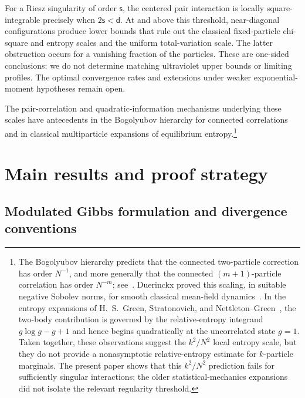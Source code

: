 \documentclass[11pt,reqno]{amsart}
\numberwithin{equation}{section}
\theoremstyle{plain}
\theoremstyle{remark}
\renewcommand{\d}{\mathsf{d}}
\newcommand{\s}{\mathsf{s}}
\begin{document}
For a Riesz singularity of order $\s$, the centered pair interaction is locally square-integrable precisely when $2\s<\d$.  At and above this threshold, near-diagonal configurations produce lower bounds that rule out the classical fixed-particle chi-square and entropy scales and the uniform total-variation scale.  The latter obstruction occurs for a vanishing fraction of the particles.  These are one-sided conclusions: we do not determine matching ultraviolet upper bounds or limiting profiles.  The optimal convergence rates and extensions under weaker exponential-moment hypotheses remain open.


The pair-correlation and quadratic-information mechanisms underlying these scales have antecedents in the Bogolyubov hierarchy for connected correlations~\cite{Bogolyubov1962} and in classical multiparticle expansions of equilibrium entropy.\footnote{The Bogolyubov hierarchy predicts that the connected two-particle correction has order \(N^{-1}\), and more generally that the connected \((m+1)\)-particle correlation has order \(N^{-m}\); see~\cite{Bogolyubov1962}.  Duerinckx proved this scaling, in suitable negative Sobolev norms, for smooth classical mean-field dynamics~\cite{DuerinckxGlauber2021}.  In the entropy expansions of H.~S.~Green, Stratonovich, and Nettleton--Green~\cite{Green1952,Stratonovich1955,NettletonGreen1958}, the two-body contribution is governed by the relative-entropy integrand \(g\log g-g+1\) and hence begins quadratically at the uncorrelated state \(g=1\).  Taken together, these observations suggest the \(k^2/N^2\) local entropy scale, but they do not provide a nonasymptotic relative-entropy estimate for \(k\)-particle marginals.  The present paper shows that this \(k^2/N^2\) prediction fails for sufficiently singular interactions; the older statistical-mechanics expansions did not isolate the relevant regularity threshold.}

\section{Main results and proof strategy}
\label{sec:main-results-proof-strategy}

\subsection{Modulated Gibbs formulation and divergence conventions}
\label{subsec:modulated-formulation}
\end{document}
